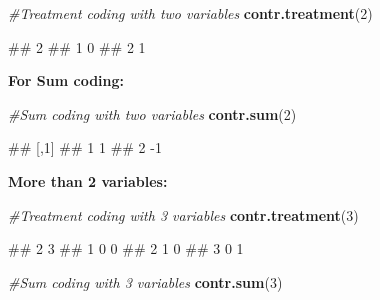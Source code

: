 \documentclass[
]{book}
\newenvironment{Shaded}{\begin{snugshade}}{\end{snugshade}}
\newcommand{\CommentTok}[1]{\textcolor[rgb]{0.56,0.35,0.01}{\textit{#1}}}
\newcommand{\DecValTok}[1]{\textcolor[rgb]{0.00,0.00,0.81}{#1}}
\newcommand{\FunctionTok}[1]{\textcolor[rgb]{0.13,0.29,0.53}{\textbf{#1}}}
\newcommand{\NormalTok}[1]{#1}
\begin{document}
\begin{Shaded}
\begin{Highlighting}[]
\CommentTok{\#Treatment coding with two variables}
\FunctionTok{contr.treatment}\NormalTok{(}\DecValTok{2}\NormalTok{)}
\end{Highlighting}
\end{Shaded}

\begin{Shaded}
\begin{Highlighting}[]
\NormalTok{\#\#   2}
\NormalTok{\#\# 1 0}
\NormalTok{\#\# 2 1}
\end{Highlighting}
\end{Shaded}

\textbf{For Sum coding:}

\begin{Shaded}
\begin{Highlighting}[]
\CommentTok{\#Sum coding with two variables}
\FunctionTok{contr.sum}\NormalTok{(}\DecValTok{2}\NormalTok{)}
\end{Highlighting}
\end{Shaded}

\begin{Shaded}
\begin{Highlighting}[]
\NormalTok{\#\#   [,1]}
\NormalTok{\#\# 1    1}
\NormalTok{\#\# 2   {-}1}
\end{Highlighting}
\end{Shaded}

\textbf{More than 2 variables:}

\begin{Shaded}
\begin{Highlighting}[]
\CommentTok{\#Treatment coding with 3 variables}
\FunctionTok{contr.treatment}\NormalTok{(}\DecValTok{3}\NormalTok{)}
\end{Highlighting}
\end{Shaded}

\begin{Shaded}
\begin{Highlighting}[]
\NormalTok{\#\#   2 3}
\NormalTok{\#\# 1 0 0}
\NormalTok{\#\# 2 1 0}
\NormalTok{\#\# 3 0 1}
\end{Highlighting}
\end{Shaded}

\begin{Shaded}
\begin{Highlighting}[]
\CommentTok{\#Sum coding with 3 variables}
\FunctionTok{contr.sum}\NormalTok{(}\DecValTok{3}\NormalTok{)}
\end{Highlighting}
\end{Shaded}
\end{document}
